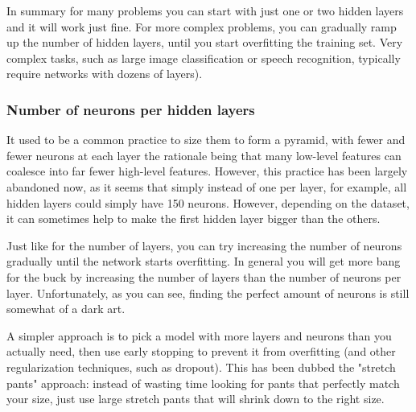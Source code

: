 In summary for many problems you can start with just one or two hidden layers and it will work just fine. For more complex problems, you can gradually ramp up the number of hidden layers, until you start overfitting the training set. Very complex tasks, such as large image classification or speech recognition, typically require networks with dozens of layers).

\subsubsection{Number of neurons per hidden layers}
It used to be a common practice to size them to form a pyramid, with fewer and fewer neurons at each layer the rationale being that many low-level features can coalesce into far fewer high-level features. However, this practice has been largely abandoned now, as it seems that simply  instead of one per layer, for example, all hidden layers could simply have 150 neurons. However, depending on the dataset, it can sometimes help to make the first hidden layer bigger than the others.

Just like for the number of layers, you can try increasing the number of neurons gradually until the network starts overfitting. In general you will get more bang for the buck by increasing the number of layers than the number of neurons per layer. Unfortunately, as you can see, finding the perfect amount of neurons is still somewhat of a dark art.

A simpler approach is to pick a model with more layers and neurons than you actually need, then use early stopping to prevent it from overfitting (and other regularization techniques, such as dropout). This has been dubbed the "stretch pants" approach: instead of wasting time looking for pants that perfectly match your size, just use large stretch pants that will shrink down to the right size.


